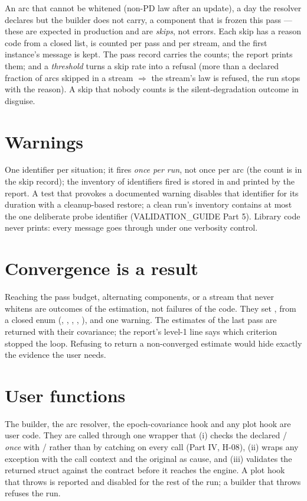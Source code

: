 An arc that cannot be whitened (non-PD law after an update), a day the resolver declares but the builder does not carry, a component that is frozen this pass --- these are expected in production and are \emph{skips}, not errors. Each skip has a reason code from a closed list, is counted per pass and per stream, and the first instance's message is kept. The pass record carries the counts; the report prints them; and a \emph{threshold} turns a skip rate into a refusal (more than a declared fraction of arcs skipped in a stream $\Rightarrow$ the stream's law is refused, the run stops with the reason). A skip that nobody counts is the silent-degradation outcome in disguise.

\section{Warnings}

One identifier per situation; it fires \emph{once per run}, not once per arc (the count is in the skip record); the inventory of identifiers fired is stored in  and printed by the report. A test that provokes a documented warning disables that identifier for its duration with a cleanup-based restore; a clean run's inventory contains at most the one deliberate probe identifier (VALIDATION\_GUIDE Part 5). Library code never prints: every message goes through  under one verbosity control.

\section{Convergence is a result}

Reaching the pass budget, alternating components, or a stream that never whitens are outcomes of the estimation, not failures of the code. They set ,  from a closed enum (, , , , ), and one warning. The estimates of the last pass are returned with their covariance; the report's level-1 line says which criterion stopped the loop. Refusing to return a non-converged estimate would hide exactly the evidence the user needs.

\section{User functions}

The builder, the arc resolver, the epoch-covariance hook and any plot hook are user code. They are called through one wrapper that (i) checks the declared / \emph{once} with / rather than by catching  on every call (Part IV, H-08), (ii) wraps any exception with the call context and the original as cause, and (iii) validates the returned struct against the contract before it reaches the engine. A plot hook that throws is reported and disabled for the rest of the run; a builder that throws refuses the run.

